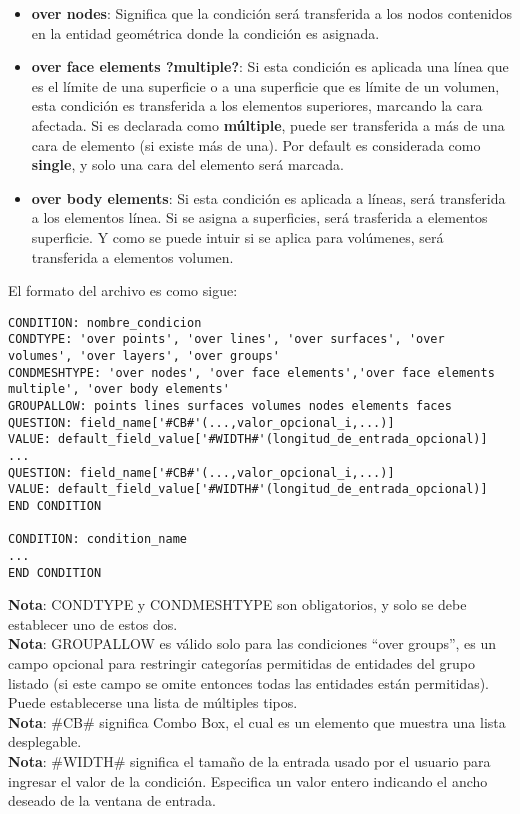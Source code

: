 \documentclass[10pt, a4paper, twocolumn]{article}
\begin{document}
\begin{itemize}
\item \textbf{over nodes}: Significa que la condición será transferida a los nodos contenidos en la entidad geométrica donde la condición es asignada.
\item \textbf{over face elements ?multiple?}: Si esta condición es aplicada una línea que es el límite de una superficie o a una superficie que es límite de un volumen, esta condición es transferida a los elementos superiores, marcando la cara afectada. Si es declarada como \textbf{múltiple}, puede ser transferida a más de una cara de elemento (si existe más de una). Por default es considerada como \textbf{single}, y solo una cara del elemento será marcada.
\item \textbf{over body elements}: Si esta condición es aplicada a líneas, será transferida a los elementos línea. Si se asigna a superficies, será trasferida a elementos superficie. Y como se puede intuir si se aplica para volúmenes, será transferida a elementos volumen.
\end{itemize}

El formato del archivo es como sigue:

\begin{lstlisting}
CONDITION: nombre_condicion
CONDTYPE: 'over points', 'over lines', 'over surfaces', 'over volumes', 'over layers', 'over groups'
CONDMESHTYPE: 'over nodes', 'over face elements','over face elements multiple', 'over body elements'
GROUPALLOW: points lines surfaces volumes nodes elements faces
QUESTION: field_name['#CB#'(...,valor_opcional_i,...)]
VALUE: default_field_value['#WIDTH#'(longitud_de_entrada_opcional)]
...
QUESTION: field_name['#CB#'(...,valor_opcional_i,...)]
VALUE: default_field_value['#WIDTH#'(longitud_de_entrada_opcional)]
END CONDITION

CONDITION: condition_name
...
END CONDITION
\end{lstlisting}

\textbf{Nota}: CONDTYPE y CONDMESHTYPE son obligatorios, y solo se debe establecer uno de estos dos.\\
\textbf{Nota}: GROUPALLOW es válido solo para las condiciones ``over groups'', es un campo opcional para restringir categorías permitidas de entidades del grupo listado (si este campo se omite entonces todas las entidades están permitidas). Puede establecerse una lista de múltiples tipos.\\
\textbf{Nota}: \#CB\# significa Combo Box, el cual es un elemento que muestra una lista desplegable.\\
\textbf{Nota}: \#WIDTH\# significa el tamaño de la entrada usado por el usuario para ingresar el valor de la condición. Especifica un valor entero indicando el ancho deseado de la ventana de entrada.\\
\end{document}
